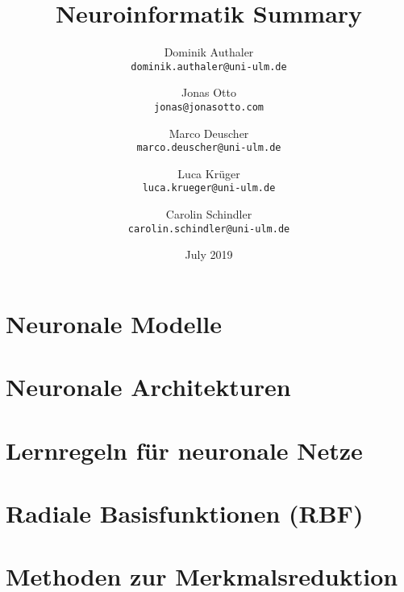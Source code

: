 \documentclass{report}
\title{Neuroinformatik Summary}
\author{
  Dominik Authaler\\
  \texttt{dominik.authaler@uni-ulm.de}
  \and
  Jonas Otto\\
  \texttt{jonas@jonasotto.com}
  \and
  Marco Deuscher\\
  \texttt{marco.deuscher@uni-ulm.de}
  \and
   Luca Krüger\\
  \texttt{luca.krueger@uni-ulm.de}
  \and
  Carolin Schindler\\
  \texttt{carolin.schindler@uni-ulm.de}
}
\date{July 2019}
\begin{document}
\maketitle

\tableofcontents
\listoftodos


\todo[inline]{}

\chapter{Neuronale Modelle}



\chapter{Neuronale Architekturen}



\chapter{Lernregeln für neuronale Netze}


\chapter{Radiale Basisfunktionen (RBF)}


\chapter{Methoden zur Merkmalsreduktion}

\end{document}
